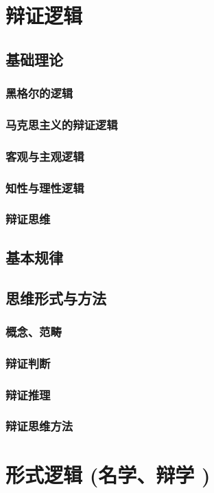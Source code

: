 \documentclass[UTF8]{../RepresentationUniverse}
\begin{document}
\section{辩证逻辑}
    \subsection{基础理论}
        \subsubsection{黑格尔的逻辑}
        \subsubsection{马克思主义的辩证逻辑}
        \subsubsection{客观与主观逻辑}
        \subsubsection{知性与理性逻辑}
        \subsubsection{辩证思维}
    \subsection{基本规律}
    \subsection{思维形式与方法}
        \subsubsection{概念、范畴}
        \subsubsection{辩证判断}
        \subsubsection{辩证推理}
        \subsubsection{辩证思维方法}

\section{形式逻辑 (名学、辩学 )}
\end{document}
